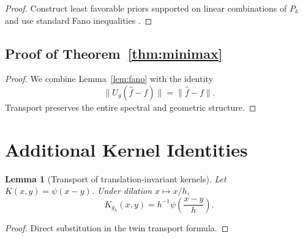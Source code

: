 \documentclass[11pt,a4paper]{article}
\newtheorem{lemma}[theorem]{Lemma}
\begin{document}
\begin{proof}
Construct least favorable priors supported on linear combinations of $P_k$ and use standard Fano inequalities \citep{Yu1997,Tsybakov2009}.
\end{proof}

\subsection{Proof of Theorem~\ref{thm:minimax}}

\begin{proof}
We combine Lemma~\ref{lem:fano} with the identity
\[
\|U_g(\hat{f} - f)\| = \|\hat{f} - f\|.
\]
Transport preserves the entire spectral and geometric structure.
\end{proof}

\section{Additional Kernel Identities}

\begin{lemma}[Transport of translation-invariant kernels]\label{lem:translation}
Let $K(x, y) = \psi(x - y)$. Under dilation $x \mapsto x/h$,
\[
K_{g_h}(x, y) = h^{-1} \psi\left(\frac{x - y}{h}\right).
\]
\end{lemma}

\begin{proof}
Direct substitution in the twin transport formula.
\end{proof}

\end{document}
